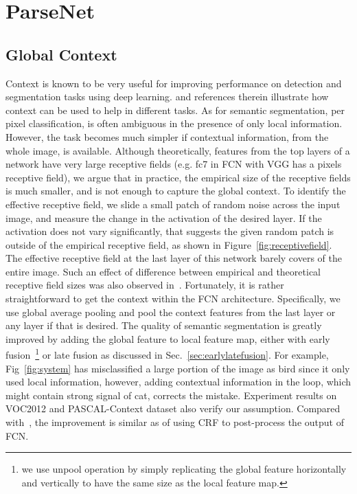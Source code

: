 \documentclass{article} \usepackage{iclr2016_conference}
\begin{document}
\section{ParseNet}
\label{sec:methods}
\subsection{Global Context}
Context is known to be very useful for improving performance on detection and segmentation tasks using deep learning. \cite{mostajabi2014feedforward, szegedy2014scalable} and references therein illustrate how context can be used to help in different tasks. As for semantic segmentation, per pixel classification, is often ambiguous in the presence of only local information. However, the task becomes much simpler if contextual information, from the whole image, is available. Although theoretically, features from the top layers of a network have very large receptive fields (e.g. fc7 in FCN with VGG has a  pixels receptive field), we argue that in practice, the empirical size of the receptive fields is much smaller, and is not enough to capture the global context. To identify the effective receptive field, we slide a small patch of random noise across the input image, and measure the change in the activation of the desired layer. If the activation does not vary significantly, that suggests the given random patch is outside of the empirical receptive field, as shown in Figure~\ref{fig:receptivefield}. The effective receptive field at the last layer of this network barely covers  of the entire image. Such an effect of difference between empirical and theoretical receptive field sizes was also observed in~\cite{zhou2014object}. Fortunately, it is rather straightforward to get the context within the FCN architecture. Specifically, we use global average pooling and pool the context features from the last layer or any layer if that is desired. The quality of semantic segmentation is greatly improved by adding the global feature to local feature map, either with early fusion~\footnote{we use unpool operation by simply replicating the global feature horizontally and vertically to have the same size as the local feature map.} or late fusion as discussed in Sec.~\ref{sec:earlylatefusion}. For example, Fig~\ref{fig:system} has misclassified a large portion of the image as bird since it only used local information, however, adding contextual information in the loop, which might contain strong signal of cat, corrects the mistake. Experiment results on VOC2012 and PASCAL-Context dataset also verify our assumption. Compared with~\cite{chen2014semantic}, the improvement is similar as of using CRF to post-process the output of FCN.
\end{document}
